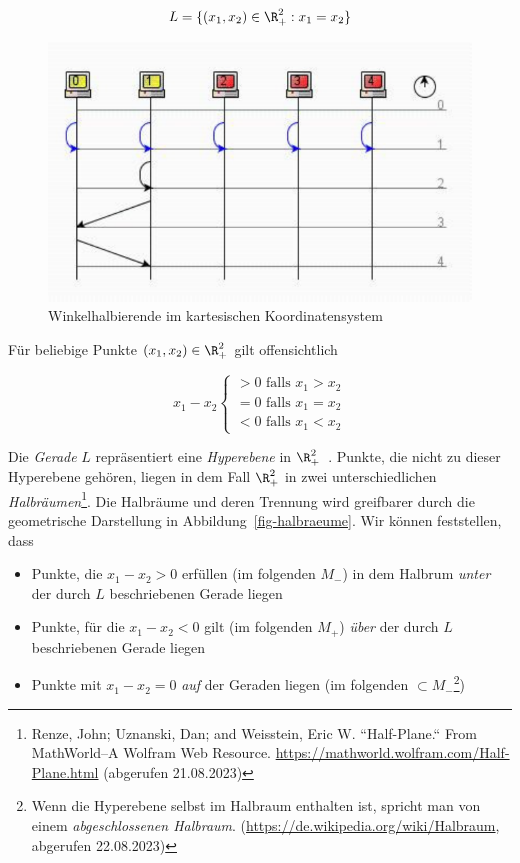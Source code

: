 \begin{equation}
L = \{(x_1, x_2) \in \R_+^2: x_1 = x_2\}
\end{equation}


\begin{figure}[h]
    \centering
    \includegraphics{images/p1ReadSeq.pdf}
    \caption{Winkelhalbierende im kartesischen Koordinatensystem}
    \label{fig-winkelhalbierende}
\end{figure}

Für beliebige Punkte $(x_1, x_2) \in \R_+^2$ gilt offensichtlich

\begin{equation}
x_1 - x_2 \begin{cases}
               > 0 \text{ falls } x_1 > x_2 \\
               = 0 \text{ falls } x_1 = x_2 \\
               < 0 \text{ falls } x_1 < x_2
\end{cases}
\end{equation}

Die \textit{Gerade} $L$ repräsentiert eine \textit{Hyperebene} in $\R_+^2$~\cite[81, Definition 2.3]{BHW+12}.
Punkte, die nicht zu dieser Hyperebene gehören, liegen in dem Fall $\R_+^2$ in zwei unterschiedlichen \textit{Halbräumen}\footnote{
    Renze, John; Uznanski, Dan; and Weisstein, Eric W. ``Half-Plane.`` From MathWorld--A Wolfram Web Resource. \url{https://mathworld.wolfram.com/Half-Plane.html} (abgerufen 21.08.2023)
}.
Die Halbräume und deren Trennung wird greifbarer durch die geometrische Darstellung in Abbildung~\ref{fig-halbraeume}.
Wir können feststellen, dass


\begin{itemize}
    \item Punkte, die $x_1 - x_2 > 0$ erfüllen (im folgenden $M_-$) in dem Halbrum \textit{unter} der durch $L$ beschriebenen Gerade liegen
    \item Punkte, für die  $x_1 - x_2 < 0$ gilt (im folgenden $M_+$) \textit{über} der durch $L$ beschriebenen Gerade liegen
    \item Punkte mit $x_1 - x_2 = 0$ \textit{auf} der Geraden liegen (im folgenden $\subset M_-$\footnote{
        Wenn die Hyperebene selbst im Halbraum enthalten ist, spricht man von einem \textit{abgeschlossenen Halbraum}. (\url{https://de.wikipedia.org/wiki/Halbraum}, abgerufen 22.08.2023)
    })
\end{itemize}


